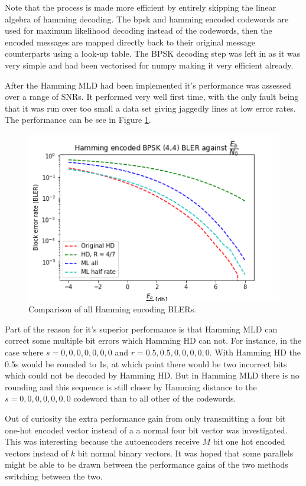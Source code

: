 \documentclass[12pt,onecolumn,letterpaper]{article}
\begin{document}
Note that the process is made more efficient by entirely skipping the linear algebra of hamming decoding. The bpsk and hamming encoded codewords are used for maximum likelihood decoding instead of the codewords, then the encoded messages are mapped directly back to their original message counterparts using a look-up table. The BPSK decoding step was left in as it was very simple and had been vectorised for numpy making it very efficient already. 

After the Hamming MLD had been implemented it's performance was assessed over a range of SNRs. It performed very well first time, with the only fault being that it was run over too small a data set giving jaggedly lines at low error rates. The performance can be see in Figure \ref{fig:HammingMldBlerAll}.

\begin{figure}
   \centering
   \includegraphics[width=0.6\linewidth]{figures/hamming_7_4_bler_vs_EbNo_comparison.png}
   \caption{Comparison of all Hamming encoding BLERs.}
   \label{fig:HammingMldBlerAll}
\end{figure}

Part of the reason for it's superior performance is that Hamming MLD can correct some multiple bit errors which Hamming HD can not. For instance, in the case where $s = 0,0,0,0,0,0,0$ and $r = 0.5,0.5,0,0,0,0,0$. With Hamming HD the 0.5s would be rounded to 1s, at which point there would be two incorrect bits which could not be decoded by Hamming HD. But in Hamming MLD there is no rounding and this sequence is still closer by Hamming distance to the $s = 0,0,0,0,0,0,0$ codeword than to all other of the codewords.

Out of curiosity the extra performance gain from only transmitting a four bit one-hot encoded vector instead of a a normal four bit vector was investigated. This was interesting because the autoencoders receive $M$ bit one hot encoded vectors instead of $k$ bit normal binary vectors. It was hoped that some parallels might be able to be drawn between the performance gains of the two methods switching between the two. 
\end{document}
